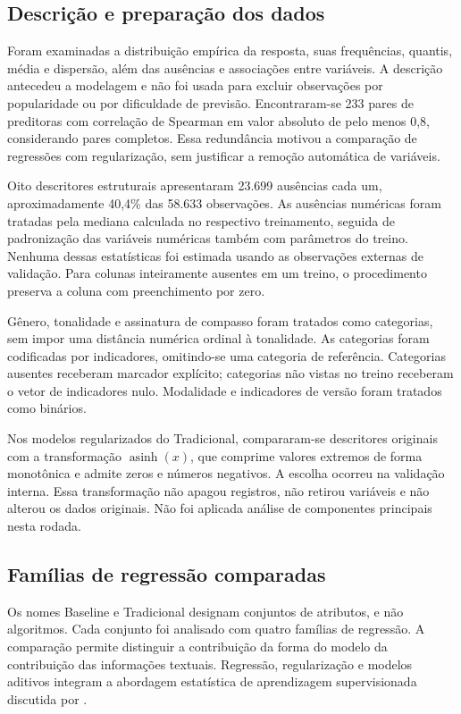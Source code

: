 \subsection{Descrição e preparação dos dados}

Foram examinadas a distribuição empírica da resposta, suas frequências, quantis, média e dispersão, além das ausências e associações entre variáveis. A descrição antecedeu a modelagem e não foi usada para excluir observações por popularidade ou por dificuldade de previsão. Encontraram-se 233 pares de preditoras com correlação de Spearman em valor absoluto de pelo menos 0,8, considerando pares completos. Essa redundância motivou a comparação de regressões com regularização, sem justificar a remoção automática de variáveis.

Oito descritores estruturais apresentaram 23.699 ausências cada um, aproximadamente 40,4\% das 58.633 observações. As ausências numéricas foram tratadas pela mediana calculada no respectivo treinamento, seguida de padronização das variáveis numéricas também com parâmetros do treino. Nenhuma dessas estatísticas foi estimada usando as observações externas de validação. Para colunas inteiramente ausentes em um treino, o procedimento preserva a coluna com preenchimento por zero.

Gênero, tonalidade e assinatura de compasso foram tratados como categorias, sem impor uma distância numérica ordinal à tonalidade. As categorias foram codificadas por indicadores, omitindo-se uma categoria de referência. Categorias ausentes receberam marcador explícito; categorias não vistas no treino receberam o vetor de indicadores nulo. Modalidade e indicadores de versão foram tratados como binários.

Nos modelos regularizados do Tradicional, compararam-se descritores originais com a transformação $\operatorname{asinh}(x)$, que comprime valores extremos de forma monotônica e admite zeros e números negativos. A escolha ocorreu na validação interna. Essa transformação não apagou registros, não retirou variáveis e não alterou os dados originais. Não foi aplicada análise de componentes principais nesta rodada.

\subsection{Famílias de regressão comparadas}

Os nomes Baseline e Tradicional designam conjuntos de atributos, e não algoritmos. Cada conjunto foi analisado com quatro famílias de regressão. A comparação permite distinguir a contribuição da forma do modelo da contribuição das informações textuais. Regressão, regularização e modelos aditivos integram a abordagem estatística de aprendizagem supervisionada discutida por \citet{james2023}.


